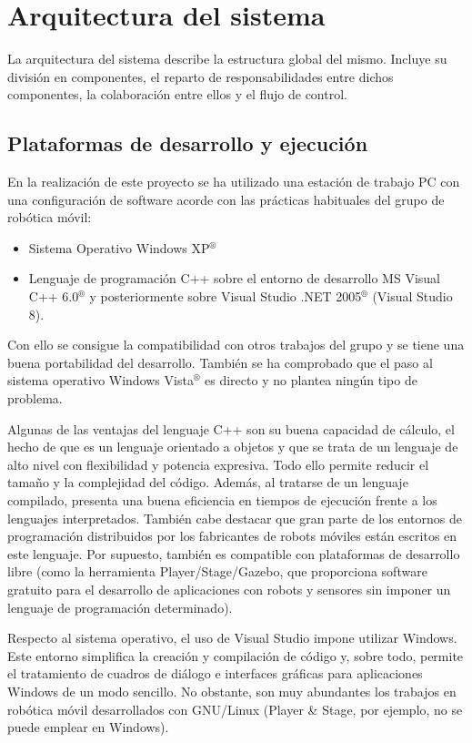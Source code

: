 
\chapter{Arquitectura del sistema}

La arquitectura del sistema describe la estructura global del mismo. Incluye su división en componentes, el reparto de responsabilidades entre dichos componentes, la colaboración entre ellos y el flujo de control.
\section{Plataformas de desarrollo y ejecución}

En la realización de este proyecto se ha utilizado una estación de trabajo PC con una configuración de software acorde con las prácticas habituales del grupo de robótica móvil:

\begin{itemize}
  \item Sistema Operativo Windows XP$^{®}$
  \item Lenguaje de programación C++ sobre el entorno de desarrollo MS Visual C++ 6.0$^{®}$ y posteriormente sobre Visual Studio .NET 2005$^{®}$ (Visual Studio 8).
\end{itemize}

Con ello se consigue la compatibilidad con otros trabajos del grupo y se tiene una buena portabilidad del desarrollo. También se ha comprobado que el paso al sistema operativo Windows Vista$^{®}$ es directo y no plantea ningún tipo de problema.

Algunas de las ventajas del lenguaje C++ son su buena capacidad de cálculo, el hecho de que es un lenguaje orientado a objetos y que se trata de un lenguaje de alto nivel con flexibilidad y potencia expresiva. Todo ello permite reducir el tamaño y la complejidad del código. Además, al tratarse de un lenguaje compilado, presenta una buena eficiencia en tiempos de ejecución frente a los lenguajes interpretados. También cabe destacar que gran parte de los entornos de programación distribuidos por los fabricantes de robots móviles están escritos en este lenguaje. Por supuesto, también es compatible con plataformas de desarrollo libre (como la herramienta Player/Stage/Gazebo, que proporciona software gratuito para el desarrollo de aplicaciones con robots y sensores sin imponer un lenguaje de programación determinado).

Respecto al sistema operativo, el uso de Visual Studio impone utilizar Windows. Este entorno simplifica la creación y compilación de código y, sobre todo, permite el tratamiento de cuadros de diálogo e interfaces gráficas para aplicaciones Windows de un modo sencillo. No obstante, son muy abundantes los trabajos en robótica móvil desarrollados con GNU/Linux (Player \& Stage, por ejemplo, no se puede emplear en Windows).

